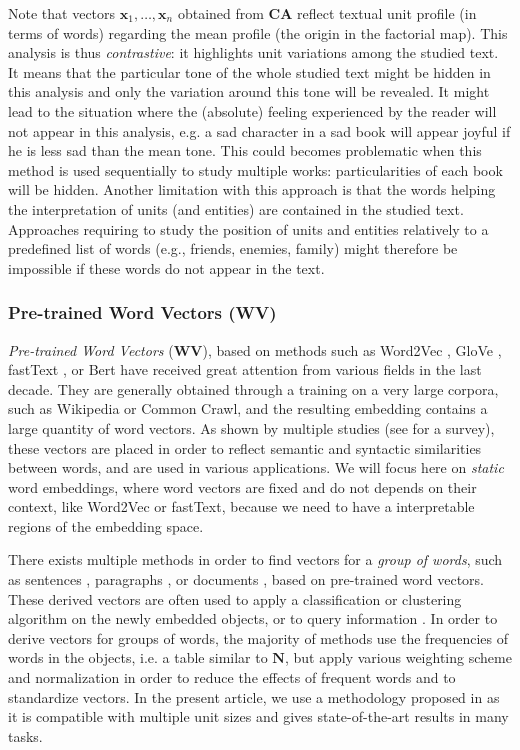 \documentclass[
twocolumn,
]{ceurart}
\begin{document}
Note that vectors $\mathbf{x}_1, \ldots, \mathbf{x}_n$ obtained from \textbf{CA} reflect textual unit profile (in terms of words) regarding the mean profile (the origin in the factorial map). This analysis is thus \emph{contrastive}: it highlights unit variations among the studied text. It means that the particular tone of the whole studied text might be hidden in this analysis and only the variation around this tone will be revealed. It might lead to the situation where the (absolute) feeling experienced by the reader will not appear in this analysis, e.g. a sad character in a sad book will appear joyful if he is less sad than the mean tone. This could becomes problematic when this method is used sequentially to study multiple works: particularities of each book will be hidden. Another limitation with this approach is that the words helping the interpretation of units (and entities) are contained in the studied text. Approaches requiring to study the position of units and entities relatively to a predefined list of words (e.g., friends, enemies, family) might therefore be impossible if these words do not appear in the text.

\subsubsection{Pre-trained Word Vectors (WV)}
\label{wv_method}

\emph{Pre-trained Word Vectors}$  $ (\textbf{WV}), based on methods such as Word2Vec \cite{Mikolov2013}, GloVe \cite{Pennington2014}, fastText \cite{Bojanowski2017}, or Bert \cite{Devlin2018} have received great attention from various fields in the last decade. They are generally obtained through a training on a very large corpora, such as Wikipedia or Common Crawl, and the resulting embedding contains a large quantity of word vectors. As shown by multiple studies (see \cite{Li2017} for a survey), these vectors are placed in order to reflect semantic and syntactic similarities between words, and are used in various applications. We will focus here on \emph{static} word embeddings, where word vectors are fixed and do not depends on their context, like Word2Vec or fastText, because we need to have a interpretable regions of the embedding space.

There exists multiple methods in order to find vectors for a \emph{group of words}, such as sentences \cite{Grener2017, Arora2017}, paragraphs \cite{Le2014}, or documents \cite{Kusner2015}, based on pre-trained word vectors. These derived vectors are often used to apply a classification or clustering algorithm on the newly embedded objects, or to query information \cite{Kusner2015, Arora2017}. In order to derive vectors for groups of words, the majority of methods use the frequencies of words in the objects, i.e. a table similar to $\mathbf{N}$, but apply various weighting scheme and normalization in order to reduce the effects of frequent words and to standardize vectors. In the present article, we use a methodology proposed in \cite{Arora2017} as it is compatible with multiple unit sizes and gives state-of-the-art results in many tasks. 
\end{document}
